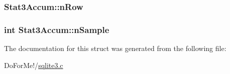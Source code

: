 \hypertarget{struct_stat3_accum_a9232d8f0271bc7feff09927e1683fdfc}{
\subsubsection[{n\-Row}]{ Stat3\-Accum\-::n\-Row}}\label{struct_stat3_accum_a9232d8f0271bc7feff09927e1683fdfc}
\hypertarget{struct_stat3_accum_a184bb13725f39f27c8d8af88a52d198e}{
\subsubsection[{n\-Sample}]{\setlength{\rightskip}{0pt plus 5cm}int Stat3\-Accum\-::n\-Sample}}\label{struct_stat3_accum_a184bb13725f39f27c8d8af88a52d198e}


The documentation for this struct was generated from the following file\-:\begin{DoxyCompactItemize}
\item 
Do\-For\-Me!/\hyperlink{sqlite3_8c}{sqlite3.\-c}\end{DoxyCompactItemize}
